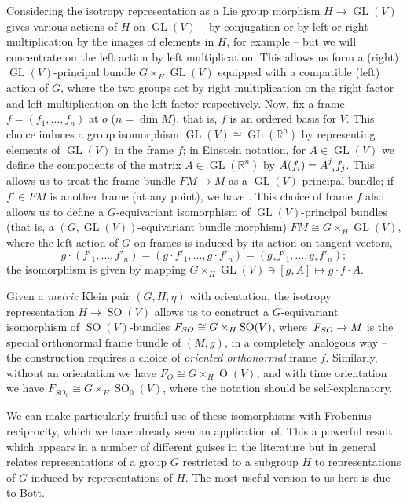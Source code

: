 \documentclass[11pt]{article}
\numberwithin{equation}{section}
\numberwithin{equation}{section}
\newcommand{\RR}{\mathbb{R}}
\newcommand{\1}{\mathbbm{1}}
\DeclareMathOperator{\GL}{GL}
\DeclareMathOperator{\Orth}{O}
\DeclareMathOperator{\SO}{SO}
\begin{document}
Considering the isotropy representation as a Lie group morphism $H\to\GL(V)$ gives various actions of $H$ on $\GL(V)$ -- by conjugation or by left or right multiplication by the images of elements in $H$, for example -- but we will concentrate on the left action by left multiplication. This allows us form a (right) $\GL(V)$-principal bundle $G\times_H \GL(V)$ equipped with a compatible (left) action of $G$, where the two groups act by right multiplication on the right factor and left multiplication on the left factor respectively. Now, fix a frame $f=(f_1,\dots,f_n)$ at $o$ ($n=\dim M$), that is, $f$ is an ordered basis for $V$. This choice induces a group isomorphism $\GL(V)\cong\GL(\RR^n)$ by representing elements of $\GL(V)$ in the frame $f$; in Einstein notation, for $A\in\GL(V)$ we define the components of the matrix $\underline{A}\in \GL(\RR^n)$ by $A(f_i)=A\indices{^j_i}f_j$. This allows us to treat the frame bundle $FM\to M$ as a $\GL(V)$-principal bundle; if $f'\in FM$ is another frame (at any point), we have
.
This choice of frame $f$ also allows us to define a $G$-equivariant isomorphism of $\GL(V)$-principal bundles (that is, a $(G,\GL(V))$-equivariant bundle morphism)
$FM \cong G\times_H \GL(V)$,
where the left action of $G$ on frames is induced by its action on tangent vectors,
\[%
	g\cdot (f'_1,\dots,f'_n) = (g\cdot f'_1,\dots,g\cdot f'_n) = (g_*f'_1,\dots,g_*f'_n);
\]
the isomorphism is given by mapping $G\times_H \GL(V)\ni [g,A]\mapsto g\cdot f \cdot A$.

Given a \emph{metric} Klein pair $(G,H,\eta)$ with orientation, the isotropy representation $H\to\SO(V)$ allows us to construct a $G$-equivariant isomorphism of $\SO(V)$-bundles
$F_{\rm SO} \cong G\times_H \SO(V)$,
where~${F_{\rm SO}\to M}$ is the special orthonormal frame bundle of $(M,g)$, in a completely analogous way -- the construction requires a choice of \emph{oriented orthonormal} frame $f$. Similarly, without an orientation we have $F_O\cong G\times_H\Orth(V)$, and with time orientation we have $F_{SO_0}\cong G\times_H\SO_0(V)$, where the notation should be self-explanatory.

We can make particularly fruitful use of these isomorphisms with Frobenius reciprocity, which we have already seen an application of. This a powerful result which appears in a number of different guises in the literature but in general relates representations of a group $G$ restricted to a subgroup $H$ to representations of $G$ induced by representations of $H$. The most useful version to us here is due to Bott.
\end{document}
